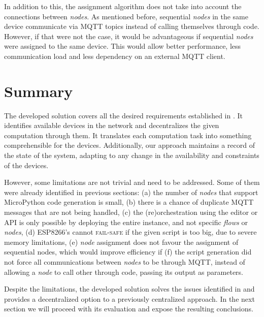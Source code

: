 In addition to this, the assignment algorithm does not take into account the connections between \textit{nodes}. As mentioned before, sequential \textit{nodes} in the same device communicate via MQTT topics instead of calling themselves through code. However, if that were not the case, it would be advantageous if sequential \textit{nodes} were assigned to the same device. This would allow better performance, less communication load and less dependency on an external MQTT client.

\section{Summary}\label{sec:solution_summary}

The developed solution covers all the desired requirements established in . It identifies available devices in the network and decentralizes the given computation through them. It translates each computation task into something comprehensible for the devices. Additionally, our approach maintains a record of the state of the system, adapting to any change in the availability and constraints of the devices.

However, some limitations are not trivial and need to be addressed. Some of them were already identified in previous sections: (a) the number of \textit{nodes} that support MicroPython code generation is small, (b) there is a chance of duplicate MQTT messages that are not being handled, (c) the (re)orchestration using the editor or API is only possible by deploying the entire instance, and not specific \textit{flows} or \textit{nodes}, (d) ESP8266's cannot \textsc{fail-safe} if the given script is too big, due to severe memory limitations, (e) \textit{node} assignment does not favour the assignment of sequential nodes, which would improve efficiency if (f) the script generation did not force all communications between \textit{nodes} to be through MQTT, instead of allowing a \textit{node} to call other through code, passing its output as parameters.

Despite the limitations, the developed solution solves the issues identified in  and provides a decentralized option to a previously centralized approach. In the next section we will proceed with its evaluation and expose the resulting conclusions. 